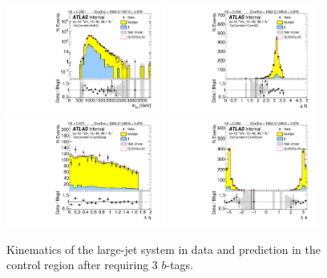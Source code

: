 \begin{figure}[htbp!]
\begin{center}
\includegraphics[width=0.45\textwidth,angle=-90]{figures/boosted/Control/b77_ThreeTag_Control_mHH_l_1.pdf}
\includegraphics[width=0.45\textwidth,angle=-90]{figures/boosted/Control/b77_ThreeTag_Control_hCandDr.pdf}\\
\includegraphics[width=0.45\textwidth,angle=-90]{figures/boosted/Control/b77_ThreeTag_Control_hCandDeta.pdf}
\includegraphics[width=0.45\textwidth,angle=-90]{figures/boosted/Control/b77_ThreeTag_Control_hCandDphi.pdf}
  \caption{Kinematics of the large-\R jet system in data and prediction in the control region after requiring 3 $b$-tags.  }
  \label{fig:boosted-3b-control-ak10-system}
\end{center}
\end{figure}

